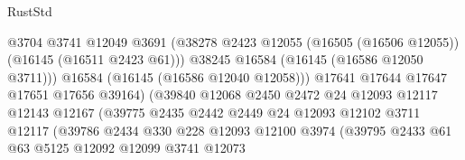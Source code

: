 \begin{lexlean}{RustStd}
\begin{coremodule}
                                          @3704
                                          @3741
                                          @12049
                                          @3691
                                          (@38278
                                            @2423
                                            @12055
                                            (@16505 (@16506 @12055))
                                            (@16145 (@16511 @2423 @61)))
                                          @38245
                                          @16584
                                          (@16145 (@16586 @12050 @3711)))
                                        @16584
                                        (@16145 (@16586 @12040 @12058)))
                                      @17641
                                      @17644
                                      @17647
                                      @17651
                                      @17656
                                      @39164)
                                    (@39840
                                      @12068
                                      @2450
                                      @2472
                                      @24
                                      @12093
                                      @12117
                                      @12143
                                      @12167
                                      (@39775
                                        @2435
                                        @2442
                                        @2449
                                        @24
                                        @12093
                                        @12102
                                        @3711
                                        @12117
                                        (@39786
                                          @2434
                                          @330
                                          @228
                                          @12093
                                          @12100
                                          @3974
                                          (@39795
                                            @2433
                                            @61
                                            @63
                                            @5125
                                            @12092
                                            @12099
                                            @3741
                                            @12073

\end{coremodule}
\end{lexlean}
